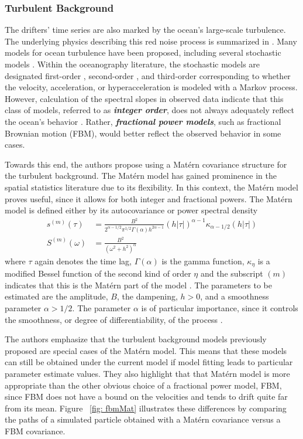 \documentclass{stat572Style}
\begin{document}
\subsubsection{Turbulent Background}
The drifters' time series are also marked by the ocean's large-scale turbulence. The underlying physics describing this red noise process is summarized in \citet{Rhines1979}. Many models for ocean turbulence have been proposed, including several stochastic models \citep{Lacasce2008}. Within the oceanography literature, the stochastic models are designated  first-order \citep{Griffa1995, Falco2000}, second-order \citep{Sawford1991}, and third-order corresponding to  whether the velocity, acceleration, or hyperacceleration is modeled with a Markov process. However, calculation of the spectral slopes in observed data indicate that this class of models, referred to as \textbf{\it{integer order}},  does not always adequately reflect the ocean's behavior \citep{Rupolo1996, Sanderson1991}. Rather, \textbf{\it{fractional power models}}, such as fractional Brownian motion (FBM), would better reflect the observed behavior in some cases.

Towards this end, the authors propose using a Mat\'{e}rn covariance structure \citep{Gneiting2012} for the turbulent background. The Mat\'{e}rn model has gained prominence in the spatial statistics literature due to its flexibility. In this context, the Mat\'{e}rn model proves useful, since it allows for both integer and fractional powers. The Mat\'{e}rn model is defined either by its autocovariance or power spectral density
\begin{align}
\label{eq:maternAC}
s^{(m)}(\tau) &= \frac{B^{2}}{2^{\alpha - 1/2}\pi^{1/2} \Gamma(\alpha) h^{2 \alpha - 1}}(h|\tau|)^{\alpha - 1}\kappa_{\alpha - 1/2}(h|\tau|)\\
\label{eq:maternPSD}
S^{(m)}(\omega) &= \frac{B^{2}}{(\omega^{2} + h^{2})^{\alpha}}
\end{align}
where $\tau$ again denotes the time lag, $\Gamma(\alpha)$ is the gamma function,  $\kappa_{\eta}$ is a modified Bessel function of the second kind of order $\eta$  and the subscript $(m)$ indicates that this is the Mat\'{e}rn part of the model \citep{Stein2012}. The parameters to be estimated are the amplitude, $B$, the dampening, $h > 0$, and a smoothness parameter $\alpha > 1/2$. The parameter $\alpha$ is of particular importance, since it controls the smoothness, or degree of differentiability, of the process \citep{Fuentes2010}. 

The authors emphasize that the turbulent background models previously proposed are special cases of the Mat\'{e}rn model. This means that these models can still be obtained under the current model if model fitting leads to particular parameter estimate values. They also highlight that that Mat\'{e}rn model is more appropriate than the other obvious choice of a fractional power model, FBM, since FBM does not have a bound on the velocities and tends to drift quite far from its mean. Figure ~\ref{fig: fbmMat} illustrates these differences by comparing the paths of a simulated particle obtained with a Mat\'{e}rn  covariance versus a FBM covariance. 
\end{document}
